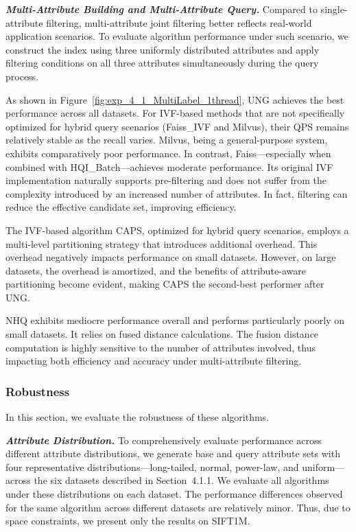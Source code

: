\documentclass[sigconf, nonacm]{acmart}
\begin{document}
\begin{sloppypar}
\vspace{10pt}
\textit{\textbf{Multi-Attribute Building and Multi-Attribute Query.}}  
Compared to single-attribute filtering, multi-attribute joint filtering better reflects real-world application scenarios. To evaluate algorithm performance under such scenario, we construct the index using three uniformly distributed attributes and apply filtering conditions on all three attributes simultaneously during the query process.

As shown in Figure~\ref{fig:exp_4_1_MultiLabel_1thread}, UNG achieves the best performance across all datasets. For IVF-based methods that are not specifically optimized for hybrid query scenarios (Faiss\_IVF and Milvus), their QPS remains relatively stable as the recall varies. Milvus, being a general-purpose system, exhibits comparatively poor performance. In contrast, Faiss—especially when combined with HQI\_Batch—achieves moderate performance. Its original IVF implementation naturally supports pre-filtering and does not suffer from the complexity introduced by an increased number of attributes. In fact, filtering can reduce the effective candidate set, improving efficiency.

The IVF-based algorithm CAPS, optimized for hybrid query scenarios, employs a multi-level partitioning strategy that introduces additional overhead. This overhead negatively impacts performance on small datasets. However, on large datasets, the overhead is amortized, and the benefits of attribute-aware partitioning become evident, making CAPS the second-best performer after UNG.

NHQ exhibits mediocre performance overall and performs particularly poorly on small datasets. It relies on fused distance calculations. The fusion distance computation is highly sensitive to the number of attributes involved, thus impacting both efficiency and accuracy under multi-attribute filtering.




\subsubsection{Robustness}In this section, we evaluate the robustness of these algorithms.

\textit{\textbf{Attribute Distribution.}} To comprehensively evaluate performance across different attribute distributions, we generate base and query attribute sets with four representative distributions—long-tailed, normal, power-law, and uniform—across the six datasets described in Section~4.1.1. We evaluate all algorithms under these distributions on each dataset. The performance differences observed for the same algorithm across different datasets are relatively minor. Thus, due to space constraints, we present only the results on SIFT1M.


\end{sloppypar}
\end{document}
